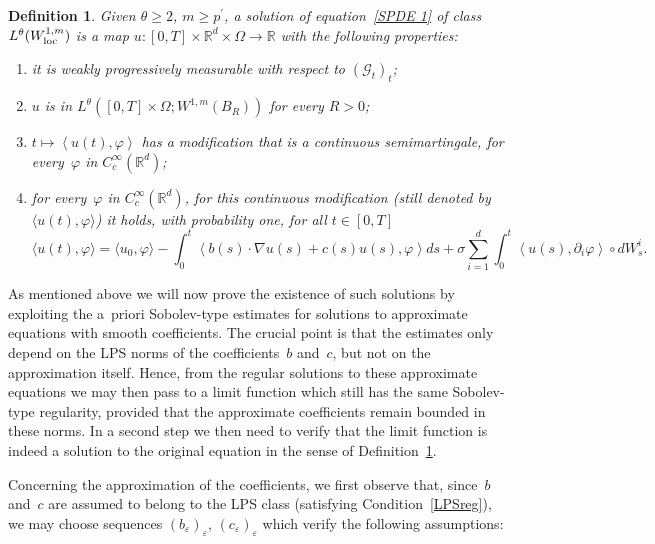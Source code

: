 \documentclass[a4paper,10pt]{article}
\newtheorem{definition}[theorem]{Definition}
\newcommand\1{\mathbbm{1}}
\newcommand{\eps}{\varepsilon}
\newcommand\loc{{\rm loc}}
\numberwithin{equation}{section}
\begin{document}
\begin{definition}
\label{Defin regular solutions}Given $\theta\geq2$, $m\geq p^{\prime}$, \emph{a solution of equation~\eqref{SPDE 1} of class $L^{\theta}(  W_{\loc}^{1,m})$} is a map $u:[0,T]\times\mathbb{R}^{d}\times\Omega \rightarrow \mathbb{R}$ with the following properties:
\begin{enumerate}[font=\normalfont, label=(\roman{*}), ref=(\roman{*})]
 \item[(o)] it is weakly progressively measurable with respect to $(\mathcal{G}_{t})_t$; 
 \item $u$ is in $L^{\theta}([0,T]\times\Omega ;W^{1,m}(B_{R}))$ for every $R>0$; \label{strat0}
 \item \label{strat1} $t\mapsto\left\langle u(t)  ,\varphi\right\rangle $ has a modification that is a continuous semimartingale, for every~$\varphi$ in $C_{c}^{\infty}(\mathbb{R}^{d})$; 
 \item for every~$\varphi$ in $C_{c}^{\infty}(\mathbb{R}^{d})$, for this continuous modification \textup{(}still denoted by $\langle u(t),\varphi\rangle$\textup{)} it holds, with probability one, for all $t \in [0,T]$ \label{strat2}
 \begin{equation}
 \langle u(t),\varphi\rangle=\langle u_{0},\varphi\rangle -\int_{0}^{t}\left\langle b(s) \cdot\nabla u(s) +c(s) u(s),\varphi\right\rangle ds+\sigma \sum_{i=1}^{d}\int_{0}^{t}\left\langle u(s),\partial_{i} \varphi\right\rangle \circ dW_{s}^{i}.\label{SPDEdiff} 
 \end{equation}
\end{enumerate}
\end{definition}

As mentioned above we will now prove the existence of such solutions by exploiting the a~priori Sobolev-type estimates for solutions to approximate equations with smooth coefficients. The crucial point is that the estimates only depend on the LPS norms of the coefficients~$b$ and~$c$, but not on the approximation itself. Hence, from the regular solutions to these approximate equations we may then pass to a limit function which still has the same Sobolev-type regularity, provided that the approximate coefficients remain bounded in these norms. In a second step we then need to verify that the limit function is indeed a solution to the original equation in the sense of Definition~\ref{Defin regular solutions}. 

Concerning the approximation of the coefficients, we first observe that, since~$b$ and~$c$ are assumed to belong to the LPS class (satisfying Condition~\ref{LPSreg}), we may choose sequences $(b_\eps)_\eps$, $(c_\eps)_\eps$ which verify the following assumptions:
\end{document}
